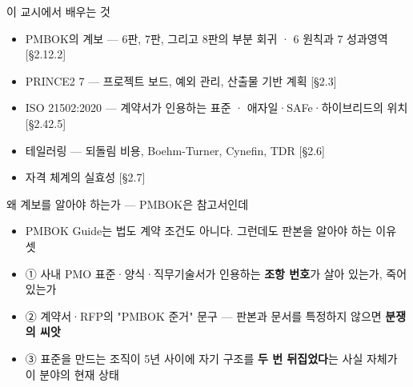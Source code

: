 \begin{frame}{이 교시에서 배우는 것}
\begin{itemize}
\item PMBOK의 계보 — 6판, 7판, 그리고 8판의 부분 회귀 · 6 원칙과 7 성과영역 [§2.1\til{}2.2]
\item PRINCE2 7 — 프로젝트 보드, 예외 관리, 산출물 기반 계획 [§2.3]
\item ISO 21502:2020 — 계약서가 인용하는 표준 · 애자일·SAFe·하이브리드의 위치 [§2.4\til{}2.5]
\item 테일러링 — 되돌림 비용, Boehm-Turner, Cynefin, TDR [§2.6]
\item 자격 체계의 실효성 [§2.7]
\end{itemize}
\end{frame}

\begin{frame}{왜 계보를 알아야 하는가 — PMBOK은 참고서인데}
\begin{itemize}
\item PMBOK Guide는 법도 계약 조건도 아니다. 그런데도 판본을 알아야 하는 이유 셋
\item ① 사내 PMO 표준·양식·직무기술서가 인용하는 \textbf{조항 번호}가 살아 있는가, 죽어 있는가
\item ② 계약서·RFP의 "PMBOK 준거" 문구 — 판본과 문서를 특정하지 않으면 \textbf{분쟁의 씨앗}
\item ③ 표준을 만드는 조직이 5년 사이에 자기 구조를 \textbf{두 번 뒤집었다}는 사실 자체가 이 분야의 현재 상태
\end{itemize}
\end{frame}

